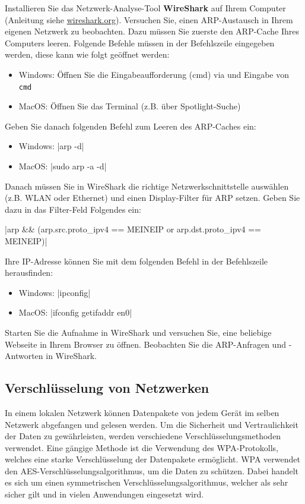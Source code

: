 \begin{mychallenge}
	Installieren Sie das Netzwerk-Analyse-Tool \textbf{WireShark} auf Ihrem Computer (Anleitung siehe \href{https://www.wireshark.org/download.html}{wireshark.org}). Versuchen Sie, einen \gls{ARP}-Austausch in Ihrem eigenen Netzwerk zu beobachten. Dazu müssen Sie zuerste den \gls{ARP}-Cache Ihres Computers leeren. Folgende Befehle müssen in der Befehlszeile eingegeben werden, diese kann wie folgt geöffnet werden:

	\begin{itemize}
		\item Windows: Öffnen Sie die Eingabeaufforderung (cmd) via  und Eingabe von \texttt{cmd}
		\item MacOS: Öffnen Sie das Terminal (z.B. über Spotlight-Suche)
	\end{itemize}

	Geben Sie danach folgenden Befehl zum Leeren des \gls{ARP}-Caches ein:
	\begin{itemize}
		\item Windows: \commandbox*|arp -d|
		\item MacOS: \commandbox*|sudo arp -a -d|
	\end{itemize}

	Danach müssen Sie in WireShark die richtige Netzwerkschnittstelle auswählen (z.B. WLAN oder Ethernet) und einen Display-Filter für \gls{ARP} setzen. Geben Sie dazu in das Filter-Feld Folgendes ein:

	\commandbox|arp && (arp.src.proto_ipv4 == MEINEIP or arp.dst.proto_ipv4 == MEINEIP)|

	Ihre \gls{IP}-Adresse können Sie mit dem folgenden Befehl in der Befehlszeile herausfinden:

	\begin{itemize}
		\item Windows: \commandbox*|ipconfig|
		\item MacOS: \commandbox*|ifconfig getifaddr en0|
	\end{itemize}

	Starten Sie die Aufnahme in WireShark und versuchen Sie, eine beliebige Webseite in Ihrem Browser zu öffnen. Beobachten Sie die \gls{ARP}-Anfragen und -Antworten in WireShark.
\end{mychallenge}

\subsection{Verschlüsselung von Netzwerken}
In einem lokalen Netzwerk können Datenpakete von jedem Gerät im selben Netzwerk abgefangen und gelesen werden. Um die Sicherheit und Vertraulichkeit der Daten zu gewährleisten, werden verschiedene Verschlüsselungsmethoden verwendet. Eine gängige Methode ist die Verwendung des \gls{WPA}-Protokolls, welches eine starke Verschlüsselung der Datenpakete ermöglicht. \gls{WPA} verwendet den \gls{AES}-Verschlüsselungsalgorithmus, um die Daten zu schützen. Dabei handelt es sich um einen symmetrischen Verschlüsselungsalgorithmus, welcher als sehr sicher gilt und in vielen Anwendungen eingesetzt wird.

